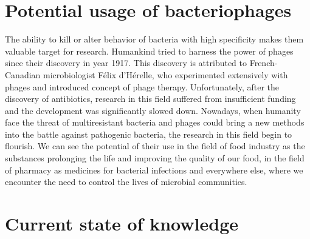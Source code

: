 \section{Potential usage of bacteriophages}
The ability to kill or alter behavior of bacteria with high specificity makes them valuable target for research.
Humankind tried to harness the power of phages since their discovery in year 1917.
This discovery is attributed to French-Canadian microbiologist Félix d'Hérelle, who experimented extensively with phages and introduced concept of phage therapy.
Unfortunately, after the discovery of antibiotics, research in this field suffered from insufficient funding and the development was significantly slowed down.
Nowadays, when humanity face the threat of multiresistant bacteria and phages could bring a new methods into the battle against pathogenic bacteria, the research in this field begin to flourish.
We can see the potential of their use in the field of food industry as the substances prolonging the life and improving the quality of our food,
in the field of pharmacy as medicines for bacterial infections and everywhere else, where we encounter the need to control the lives of microbial communities.

\section{Current state of knowledge}
\cite{phage}
